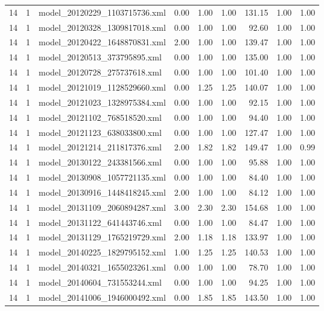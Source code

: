 \begin{table}[ht]
\begin{tabular}{rrlrrrrrr}
   14 &   1 & model\_20120229\_1103715736.xml & 0.00 & 1.00 & 1.00 & 131.15 & 1.00 & 1.00 \\ 
   14 &   1 & model\_20120328\_1309817018.xml & 0.00 & 1.00 & 1.00 & 92.60 & 1.00 & 1.00 \\ 
   14 &   1 & model\_20120422\_1648870831.xml & 2.00 & 1.00 & 1.00 & 139.47 & 1.00 & 1.00 \\ 
   14 &   1 & model\_20120513\_373795895.xml & 0.00 & 1.00 & 1.00 & 135.00 & 1.00 & 1.00 \\ 
   14 &   1 & model\_20120728\_275737618.xml & 0.00 & 1.00 & 1.00 & 101.40 & 1.00 & 1.00 \\ 
   14 &   1 & model\_20121019\_1128529660.xml & 0.00 & 1.25 & 1.25 & 140.07 & 1.00 & 1.00 \\ 
   14 &   1 & model\_20121023\_1328975384.xml & 0.00 & 1.00 & 1.00 & 92.15 & 1.00 & 1.00 \\ 
   14 &   1 & model\_20121102\_768518520.xml & 0.00 & 1.00 & 1.00 & 94.40 & 1.00 & 1.00 \\ 
   14 &   1 & model\_20121123\_638033800.xml & 0.00 & 1.00 & 1.00 & 127.47 & 1.00 & 1.00 \\ 
   14 &   1 & model\_20121214\_211817376.xml & 2.00 & 1.82 & 1.82 & 149.47 & 1.00 & 0.99 \\ 
   14 &   1 & model\_20130122\_243381566.xml & 0.00 & 1.00 & 1.00 & 95.88 & 1.00 & 1.00 \\ 
   14 &   1 & model\_20130908\_1057721135.xml & 0.00 & 1.00 & 1.00 & 84.40 & 1.00 & 1.00 \\ 
   14 &   1 & model\_20130916\_1448418245.xml & 2.00 & 1.00 & 1.00 & 84.12 & 1.00 & 1.00 \\ 
   14 &   1 & model\_20131109\_2060894287.xml & 3.00 & 2.30 & 2.30 & 154.68 & 1.00 & 1.00 \\ 
   14 &   1 & model\_20131122\_641443746.xml & 0.00 & 1.00 & 1.00 & 84.47 & 1.00 & 1.00 \\ 
   14 &   1 & model\_20131129\_1765219729.xml & 2.00 & 1.18 & 1.18 & 133.97 & 1.00 & 1.00 \\ 
   14 &   1 & model\_20140225\_1829795152.xml & 1.00 & 1.25 & 1.25 & 140.53 & 1.00 & 1.00 \\ 
   14 &   1 & model\_20140321\_1655023261.xml & 0.00 & 1.00 & 1.00 & 78.70 & 1.00 & 1.00 \\ 
   14 &   1 & model\_20140604\_731553244.xml & 0.00 & 1.00 & 1.00 & 94.25 & 1.00 & 1.00 \\ 
   14 &   1 & model\_20141006\_1946000492.xml & 0.00 & 1.85 & 1.85 & 143.50 & 1.00 & 1.00 \\ 

\end{tabular}
\end{table}
